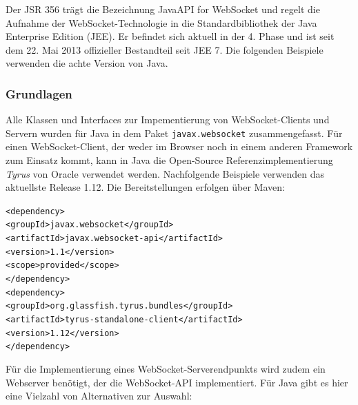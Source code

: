 \documentclass[11pt,a4paper,titlepage]{scrartcl}
\numberwithin{equation}{section}
\begin{document}
\noindent Der JSR 356 trägt die Bezeichnung Java\texttrademark API for WebSocket und regelt die Aufnahme der WebSocket-Technologie in die Standardbibliothek der Java Enterprise Edition (JEE). Er befindet sich aktuell in der 4. Phase und ist seit dem 22. Mai 2013 offizieller Bestandteil seit JEE 7. Die folgenden Beispiele verwenden die achte Version von Java.

\subsubsection{Grundlagen}
Alle Klassen und Interfaces zur Impementierung von WebSocket-Clients und Servern wurden für Java in dem Paket \texttt{javax.websocket} zusammengefasst. Für einen WebSocket-Client, der weder im Browser noch in einem anderen Framework zum Einsatz kommt, kann in Java die Open-Source Referenzimplementierung \textit{Tyrus} von Oracle verwendet werden. Nachfolgende Beispiele verwenden das aktuellste Release 1.12. Die Bereitstellungen erfolgen über Maven: 
\vspace{-5mm}
\begin{center}\parbox{0pt}{
	\begin{tabbing}
		\texttt{<depen}\=\texttt{dency>}\\
		\>\texttt{<groupId>javax.websocket</groupId>}\\
		\>\texttt{<artifactId>javax.websocket-api</artifactId>}\\
		\>\texttt{<version>1.1</version>}\\
		\>\texttt{<scope>provided</scope>}\\
		\texttt{</dependency>}\\
		\texttt{<dependency>}\\
		\>\texttt{<groupId>org.glassfish.tyrus.bundles</groupId>}\\
		\>\texttt{<artifactId>tyrus-standalone-client</artifactId>}\\
		\>\texttt{<version>1.12</version>}\\
		\texttt{</dependency>}
	\end{tabbing}}
\end{center}
\noindent Für die Implementierung eines WebSocket-Serverendpunkts wird zudem ein Webserver benötigt, der die WebSocket-API implementiert. Für Java gibt es hier eine Vielzahl von Alternativen zur Auswahl:

\begin{itemize}
\end{itemize}
\end{document}
